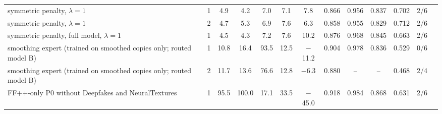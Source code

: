 \begin{tabular}{@{}lcccccccccccc@{}}
symmetric penalty, $\lambda=1$ & 1 & 4.9 & 4.2 & 7.0 & 7.1 & 7.8 & 0.866 & 0.956 & 0.837 & 0.702 & 2/6 \\
symmetric penalty, $\lambda=1$ & 2 & 4.7 & 5.3 & 6.9 & 7.6 & 6.3 & 0.858 & 0.955 & 0.829 & 0.712 & 2/6 \\
symmetric penalty, full model, $\lambda=1$ & 1 & 4.5 & 4.3 & 7.2 & 7.6 & 10.2 & 0.876 & 0.968 & 0.845 & 0.663 & 2/6 \\
smoothing expert (trained on smoothed copies only; routed model B) & 1 & 10.8 & 16.4 & 93.5 & 12.5 & $-$11.2 & 0.904 & 0.978 & 0.836 & 0.529 & 0/6 \\
smoothing expert (trained on smoothed copies only; routed model B) & 2 & 11.7 & 13.6 & 76.6 & 12.8 & $-$6.3 & 0.880 & -- & -- & 0.468 & 2/4 \\
FF++-only P0 without Deepfakes and NeuralTextures & 1 & 95.5 & 100.0 & 17.1 & 33.5 & $-$45.0 & 0.918 & 0.984 & 0.868 & 0.631 & 2/6 \\
\bottomrule
\end{tabular}

